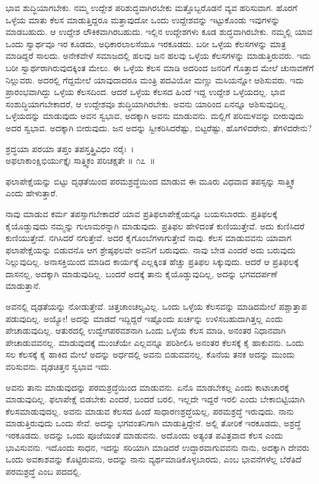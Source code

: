ಭಾವ ಶುದ್ಧಿಯಾಗಬೇಕು. ನಮ್ಮ ಉದ್ದೇಶ ಪರಿಶುದ್ಧವಾಗಿರಬೇಕು ಮತ್ತೊಬ್ಬರೊಡನೆ ವ್ಯವ ಹರಿಸುವಾಗ. ಹೊರಗೆ ಒಳ್ಳೆಯ ಮಾತು ಕೆಲಸ ಮಾಡುತ್ತಿದ್ದರೂ ಮತ್ತಾವುದೋ ಒಂದು ಉದ್ದೇಶವನ್ನು ಇಟ್ಟುಕೊಂಡು ಇವುಗಳನ್ನು ಮಾಡಬಹುದು. ಆ ಉದ್ದೇಶ ಲೌಕಿಕವಾಗಿರಬಹುದು. ಇಲ್ಲಿನ ಉದ್ದೇಶಗಳು ಕೂಡ ಶುದ್ಧವಾಗಿರಬೇಕು. ನಮ್ಮಲ್ಲಿ ಯಾವ ಒಂದು ಸ್ವಾರ್ಥವೂ ಇರ ಕೂಡದು, ಅಧಿಕಾರಲಾಲಸೆಯೂ ಇರಕೂಡದು. ಬರೀ ಒಳ್ಳೆಯ ಕೆಲಸಗಳನ್ನು ಮಾತ್ರ ಮಾಡಿದ್ದರೆ ಸಾಲದು. ಅನೇಕವೇಳೆ ಸಮಾಜದಲ್ಲಿ ಹಲವು ಜನ ಹಲವು ಒಳ್ಳೆಯ ಕೆಲಸಗಳನ್ನು ಮಾಡುತ್ತಿರುವರು. ಇದು ಬರೀ ಸ್ವಾರ್ಥರಾಗಿರುವುದಕ್ಕಿಂತ ಮೇಲು. ಈ ಒಳ್ಳೆಯ ಕೆಲಸ ಮಾಡಿ ಅದರಿಂದ ಜನರಿಗೆ ಗೊತ್ತಾದ ಮೇಲೆ ಚುನಾವಣೆಗೆ ನಿಲ್ಲುವರು. ಅದರಲ್ಲಿ ಗೆದ್ದಮೇಲೆ ಯಾವುದಾದರೂ ಮಂತ್ರಿ ಪದವಿಯೋ ಮಣ್ಣು ಮಸಿಯನ್ನೋ ಆಶಿಸುವರು. ಇದು ಪ್ರಾರಂಭವಾಗಿದ್ದು ಒಳ್ಳೆಯ ಕೆಲಸದಿಂದ. ಆದರೆ ಒಳ್ಳೆಯ ಕೆಲಸದ ಹಿಂದೆ ಇದ್ದ ಉದ್ದೇಶ ಒಳ್ಳೆಯದಲ್ಲ. ಭಾವ ಸಂಶುದ್ಧಿಯಾಗಬೇಕಾದರೆ, ಆ ಉದ್ದೇಶವೂ ಶುದ್ಧಿಯಾಗಿರಬೇಕು. ಅವನು ಯಾರಿಂದ ಏನನ್ನೂ ಆಶಿಸುವುದಿಲ್ಲ. ಒಳ್ಳೆಯದನ್ನು ಮಾಡುವುದು ಅವನ ಸ್ವಭಾವ, ಅದಕ್ಕಾಗಿ ಅವನು ಮಾಡುವನು. ಮಲ್ಲಿಗೆ ಪರಿಮಳವನ್ನು ಬೀರುವುದು ಅದರ ಸ್ವಭಾವ. ಅದಕ್ಕಾಗಿ ಬೀರುವುದು. ಜನ ಅದನ್ನು ಸ್ವೀಕರಿಸಿದರೆಷ್ಟು, ಬಿಟ್ಟರೆಷ್ಟು, ಹೊಗಳಿದರೇನು, ತೆಗಳಿದರೇನು?

\begin{shloka}
ಶ್ರದ್ಧಯಾ ಪರಯಾ ತಪ್ತಂ ತಪಸ್ತತ್ತ್ರಿವಿಧಂ ನರೈಃ~।\\ಅಫಲಾಕಾಂಕ್ಷಿಭಿರ್ಯುಕ್ತೈಃ ಸಾತ್ತ್ವಿಕಂ ಪರಿಚಕ್ಷತೇ \hfill॥ ೧೭~॥
\end{shloka}

\begin{artha}
ಫಲಾಪೇಕ್ಷೆಯನ್ನು ಬಿಟ್ಟು ದೃಢತೆಯಿಂದ ಪರಮಶ್ರದ್ಧೆಯಿಂದ ಮಾಡುವ ಈ ಮೂರು ವಿಧವಾದ ತಪಸ್ಸನ್ನು ಸಾತ್ತ್ವಿಕ ಎಂದು ಹೇಳುತ್ತಾರೆ.
\end{artha}

ನಾವು ಮಾಡುವ ಕರ್ಮ ತಪಸ್ಸಾಗಬೇಕಾದರೆ ಯಾವ ಪ್ರತಿಫಲಾಪೇಕ್ಷೆಯನ್ನೂ ಬಯಸ\-ಬಾರದು. ಪ್ರತಿಫಲಕ್ಕೆ ಕೈಯೊಡ್ಡುವುದು ನಮ್ಮನ್ನು ಗುಲಾಮರನ್ನಾಗಿ ಮಾಡುವುದು. ಪ್ರತಿಫಲ ಹೇಳಿದಂತೆ ಕುಣಿಯುತ್ತೇವೆ. ಅದು ಕುಣಿಸಿದರೆ ಕುಣಿಯುತ್ತೇವೆ. ನಗಿಸಿದರೆ ನಗುತ್ತೇವೆ. ಅದರ ಕೈಗೊಂಬೆಗಳಾಗುತ್ತೇವೆ ನಾವು. ಕೆಲಸ ಮಾಡುವವನು ಯಾವಾಗ ಫಲಾಪೇಕ್ಷೆಯನ್ನು ಬಿಡುವನೊ ಆಗ ಶ್ರೇಷ್ಠಫಲವೇ ಅವನಿಗೆ ಬರುವುದು. ನಾವು ಬೇಡ ಎಂದರೆ ಅದು ಬರುವುದು ನಿಲ್ಲುವುದಿಲ್ಲ. ಅನಾಸಕ್ತಿಯಿಂದ ಮಾಡಿದ ಕಾರ್ಯಕ್ಕೆ ಎಲ್ಲಕ್ಕಿಂತ ಹೆಚ್ಚು ಪ್ರತಿಫಲ ಸಿಕ್ಕುವುದು. ಆದರೆ ಆ ಪ್ರತಿಫಲಕ್ಕೆ ದಾಸನಲ್ಲ, ಅದಕ್ಕಾಗಿ ಮಾಡುವುದಿಲ್ಲ. ಬಂದರೆ ಅದಕ್ಕೆ ತಾನು ಕೈಯೊಡ್ಡುವುದಿಲ್ಲ, ಅದನ್ನು ಭಗವದರ್ಪಣೆ ಮಾಡುತ್ತಾನೆ.

ಅವನಲ್ಲಿ ದೃಢತೆಯನ್ನು ನೋಡುತ್ತೇವೆ. ಚಿತ್ತಚಾಂಚಲ್ಯವಿಲ್ಲ. ಒಂದು ಒಳ್ಳೆಯ ಕೆಲಸವನ್ನು ಮಾಡಿದಮೇಲೆ ಪಶ್ಚಾತ್ತಾಪ ಪಡುವುದಿಲ್ಲ. ಅಯ್ಯೋ! ಅದನ್ನು ಮಾಡದೆ ಇದ್ದಿದ್ದರೆ ಇಷ್ಟೊಂದು ಖರ್ಚನ್ನು ಉಳಿಸಬಹುದಾಗಿತ್ತಲ್ಲ ಎಂದು ಪೇಚಾಡುವುದಿಲ್ಲ. ಆತುರದಲ್ಲಿ ಉದ್ವೇಗಪರವಶನಾಗಿ ಒಂದು ಒಳ್ಳೆಯ ಕೆಲಸ ಮಾಡಿ, ಅನಂತರ ನಿಧಾನವಾಗಿ ಪೇಚಾಡುವವನಲ್ಲ. ಮಾಡುವುದಕ್ಕೆ ಮುಂಚೆಯೇ ಎಲ್ಲವನ್ನೂ ಪರಿಶೀಲಿಸಿ ಅನಂತರ ಕೆಲಸಕ್ಕೆ ಕೈ ಹಾಕುವನು. ಒಂದು ಸಲ ಕೆಲಸಕ್ಕೆ ಕೈ ಹಾಕಿದ ಮೇಲೆ ಅದನ್ನು ಅರ್ಧದಲ್ಲಿ ಅವನು ಬಿಡುವವನಲ್ಲ. ಕೊನೆಯ ತನಕ ಅದನ್ನು ಮುಂದು ವರಿಸುವನು. ದೃಢಚಿತ್ತನ ಸ್ವಭಾವ ಇದು.

ಅವನು ತಾನು ಮಾಡುವುದನ್ನು ಪರಮಶ್ರದ್ಧೆಯಿಂದ ಮಾಡುವನು. ಏನೊ ಮಾಡಬೇಕಲ್ಲ ಎಂದು ಕಾಟಾಚಾರಕ್ಕೆ ಮಾಡುವುದಿಲ್ಲ. ಫಲಾಪೇಕ್ಷೆ ಬಿಡಬೇಕು ಎಂದರೆ, ಬಂದರೆ ಬರಲಿ, ಇಲ್ಲದೇ ಇದ್ದರೆ ಇರಲಿ ಎಂದು ಬೇಕಾಬಿಟ್ಟಿಯಾಗಿ ಕೆಲಸಮಾಡುವುದಲ್ಲ. ಅವನು ಮಾಡುವ ಕೆಲಸದ ಹಿಂದೆ ಸಾಧಾರಣಶ್ರದ್ಧೆಯಲ್ಲ, ಪರಮಶ್ರದ್ಧೆ ಇರುವುದು. ನಾನು ಮಾಡುತ್ತಿರುವುದು ಒಂದು ಸೇವೆ. ಅದನ್ನು ಭಗವಂತನಿಗಾಗಿ ಮಾಡುತ್ತಿದ್ದೇನೆ. ಅಲ್ಲಿ ತೋರಿಕೆ ಇರಕೂಡದು, ಅಶ್ರದ್ಧೆ ಇರಕೂಡದು. ಅದನ್ನು ಒಂದು ಪೂಜೆಯಂತೆ ಮಾಡುವನು. ಅದೊಂದು ಅತ್ಯಂತ ಪವಿತ್ರವಾದ ಕೆಲಸ ಎಂದು ಭಾವಿಸುವನು. ಇದೊಂದು ಸಾಧನ, ಇದನ್ನು ಸರಿಯಾಗಿ ಮಾಡಿದರೆ ಉದ್ಧಾರವಾಗುವವನು ನಾನು, ಅದಕ್ಕಾಗಿ ದೇವರು ಒಂದು ಅವಕಾಶವನ್ನು ಕೊಟ್ಟಿರುವನು, ಅದನ್ನು ನಾನು ವ್ಯರ್ಥಮಾಡಿಕೊಳ್ಳಬಾರದು, ಎಂಬ ಭಾವನೆಗಳೆಲ್ಲ ಬೆರೆತಿದೆ ಪರಮಶ್ರದ್ಧೆ ಎಂಬ ಪದದಲ್ಲಿ.

